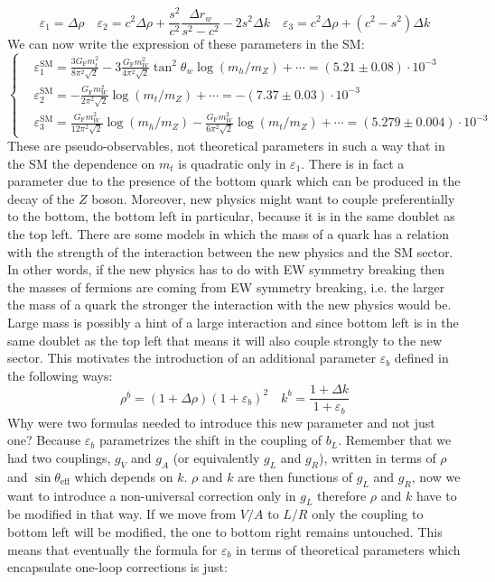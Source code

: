 \documentclass[../main.tex]{subfiles}
\begin{document}
\[
\varepsilon_1=\Delta\rho \quad \varepsilon_2=c^2\Delta\rho+\frac{s^2}{c^2}\frac{\Delta r_w}{s^2-c^2}-2s^2\Delta k \quad \varepsilon_3=c^2\Delta\rho+(c^2-s^2)\Delta k
\]
We can now write the expression of these parameters in the SM:
\[
\left\{
\begin{aligned}
&\varepsilon_1^{\text{SM}}=\frac{3G_{\text{F}}m_t^2}{8\pi^2\sqrt{2}}-3\frac{G_{\text{F}}m_W^2}{4\pi^2\sqrt{2}}\tan^2\theta_w\log(m_h/m_Z)+\cdots=(5.21\pm0.08)\cdot10^{-3}\\
&\varepsilon_2^{\text{SM}}=-\frac{G_{\text{F}}m_W^2}{2\pi^2\sqrt{2}}\log(m_t/m_Z)+\cdots=-(7.37\pm0.03)\cdot10^{-3}\\
&\varepsilon_3^{\text{SM}}=\frac{G_{\text{F}}m_W^2}{12\pi^2\sqrt{2}}\log(m_h/m_Z)-\frac{G_{\text{F}}m_W^2}{6\pi^2\sqrt{2}}\log(m_t/m_Z)+\cdots=(5.279\pm0.004)\cdot10^{-3}
\end{aligned}
\right.
\]
These are pseudo-observables, not theoretical parameters in such a way that in the SM the dependence on $m_t$ is quadratic only in $\varepsilon_1$. There is in fact a  parameter due to the presence of the bottom quark which can be produced in the decay of the $Z$ boson. Moreover, new physics might want to couple preferentially to the bottom, the bottom left in particular, because it is in the same doublet as the top left. There are some models in which the mass of a quark has a relation with the strength of the interaction between the new physics and the SM sector. In other words, if the new physics has to do with EW symmetry breaking then the masses of fermions are coming from EW symmetry breaking, i.e. the larger the mass of a quark the stronger the interaction with the new physics would be. Large mass is possibly a hint of a large interaction and since bottom left is in the same doublet as the top left that means it will also couple strongly to the new sector. This motivates the introduction of an additional parameter $\varepsilon_b$ defined in the following ways:
\[
\rho^b=(1+\Delta\rho)(1+\varepsilon_b)^2 \quad k^b=\frac{1+\Delta k}{1+\varepsilon_b}
\]
Why were two formulas needed to introduce this new parameter and not just one? Because $\varepsilon_b$ parametrizes the shift in the coupling of $b_L$. Remember that we had two couplings, $g_V$ and $g_A$ (or equivalently $g_L$ and $g_R$), written in terms of $\rho$ and $\sin\theta_{\text{eff}}$ which depends on $k$. $\rho$ and $k$ are then functions of $g_L$ and $g_R$, now we want to introduce a non-universal correction only in $g_L$ therefore $\rho$ and $k$ have to be modified in that way. If we move from $V/A$ to $L/R$ only the coupling to bottom left will be modified, the one to bottom right remains untouched. This means that eventually the formula for $\varepsilon_b$ in terms of theoretical parameters which encapsulate one-loop corrections is just:
\end{document}
